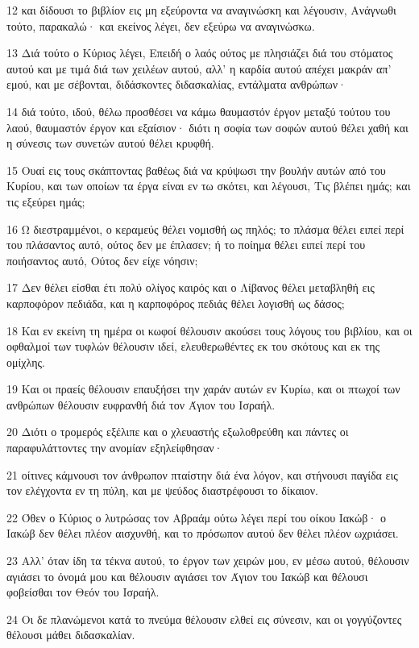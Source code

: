 \par 12 και δίδουσι το βιβλίον εις μη εξεύροντα να αναγινώσκη και λέγουσιν, Ανάγνωθι τούτο, παρακαλώ· και εκείνος λέγει, δεν εξεύρω να αναγινώσκω.
\par 13 Διά τούτο ο Κύριος λέγει, Επειδή ο λαός ούτος με πλησιάζει διά του στόματος αυτού και με τιμά διά των χειλέων αυτού, αλλ' η καρδία αυτού απέχει μακράν απ' εμού, και με σέβονται, διδάσκοντες διδασκαλίας, εντάλματα ανθρώπων·
\par 14 διά τούτο, ιδού, θέλω προσθέσει να κάμω θαυμαστόν έργον μεταξύ τούτου του λαού, θαυμαστόν έργον και εξαίσιον· διότι η σοφία των σοφών αυτού θέλει χαθή και η σύνεσις των συνετών αυτού θέλει κρυφθή.
\par 15 Ουαί εις τους σκάπτοντας βαθέως διά να κρύψωσι την βουλήν αυτών από του Κυρίου, και των οποίων τα έργα είναι εν τω σκότει, και λέγουσι, Τις βλέπει ημάς; και τις εξεύρει ημάς;
\par 16 Ω διεστραμμένοι, ο κεραμεύς θέλει νομισθή ως πηλός; το πλάσμα θέλει ειπεί περί του πλάσαντος αυτό, ούτος δεν με έπλασεν; ή το ποίημα θέλει ειπεί περί του ποιήσαντος αυτό, Ούτος δεν είχε νόησιν;
\par 17 Δεν θέλει είσθαι έτι πολύ ολίγος καιρός και ο Λίβανος θέλει μεταβληθή εις καρποφόρον πεδιάδα, και η καρποφόρος πεδιάς θέλει λογισθή ως δάσος;
\par 18 Και εν εκείνη τη ημέρα οι κωφοί θέλουσιν ακούσει τους λόγους του βιβλίου, και οι οφθαλμοί των τυφλών θέλουσιν ιδεί, ελευθερωθέντες εκ του σκότους και εκ της ομίχλης.
\par 19 Και οι πραείς θέλουσιν επαυξήσει την χαράν αυτών εν Κυρίω, και οι πτωχοί των ανθρώπων θέλουσιν ευφρανθή διά τον Άγιον του Ισραήλ.
\par 20 Διότι ο τρομερός εξέλιπε και ο χλευαστής εξωλοθρεύθη και πάντες οι παραφυλάττοντες την ανομίαν εξηλείφθησαν·
\par 21 οίτινες κάμνουσι τον άνθρωπον πταίστην διά ένα λόγον, και στήνουσι παγίδα εις τον ελέγχοντα εν τη πύλη, και με ψεύδος διαστρέφουσι το δίκαιον.
\par 22 Όθεν ο Κύριος ο λυτρώσας τον Αβραάμ ούτω λέγει περί του οίκου Ιακώβ· ο Ιακώβ δεν θέλει πλέον αισχυνθή, και το πρόσωπον αυτού δεν θέλει πλέον ωχριάσει.
\par 23 Αλλ' όταν ίδη τα τέκνα αυτού, το έργον των χειρών μου, εν μέσω αυτού, θέλουσιν αγιάσει το όνομά μου και θέλουσιν αγιάσει τον Άγιον του Ιακώβ και θέλουσι φοβείσθαι τον Θεόν του Ισραήλ.
\par 24 Οι δε πλανώμενοι κατά το πνεύμα θέλουσιν ελθεί εις σύνεσιν, και οι γογγύζοντες θέλουσι μάθει διδασκαλίαν.

